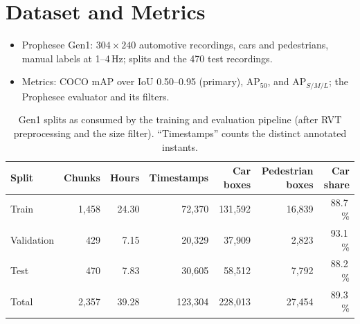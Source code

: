 \documentclass[11pt, a4paper]{report}
\begin{document}
\section{Dataset and Metrics}
\label{sec:dataset}
\begin{itemize}
  \item Prophesee Gen1: $304\times240$ automotive recordings, cars and pedestrians, manual labels at 1--4\,Hz; splits and the 470 test recordings.
  \item Metrics: COCO mAP over IoU 0.50--0.95 (primary), $\mathrm{AP}_{50}$, and $\mathrm{AP}_{S/M/L}$; the Prophesee evaluator and its filters.
\end{itemize}
\begin{table}[htbp]
\centering
\small
\caption{Gen1 splits as consumed by the training and evaluation pipeline (after RVT preprocessing and
the size filter). ``Timestamps'' counts the distinct annotated instants.}
\label{tab:gen1_stats}
\begin{tabular}{lrrrrrr}
\toprule
Split & Chunks & Hours & Timestamps & Car boxes & Pedestrian boxes & Car share \\
\midrule
Train      & 1{,}458 & 24.30 &  72{,}370 & 131{,}592 & 16{,}839 & 88.7\,\% \\
Validation &     429 &  7.15 &  20{,}329 &  37{,}909 &  2{,}823 & 93.1\,\% \\
Test       &     470 &  7.83 &  30{,}605 &  58{,}512 &  7{,}792 & 88.2\,\% \\
\midrule
Total      & 2{,}357 & 39.28 & 123{,}304 & 228{,}013 & 27{,}454 & 89.3\,\% \\
\bottomrule
\end{tabular}
\end{table}
\end{document}
